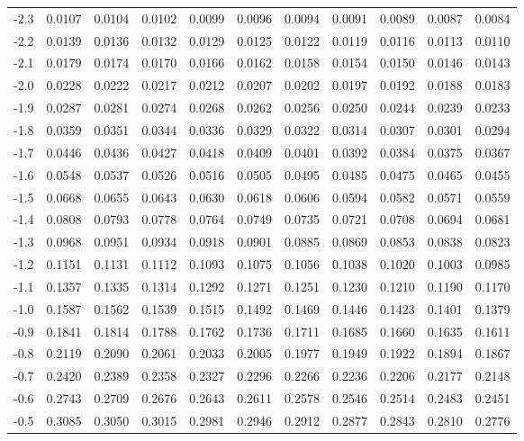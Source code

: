 \begin{table}[h]
{\begin{tabular}{|T{1.1}|T{1.4}|T{1.4}|T{1.4}|T{1.4}|T{1.4}|T{1.4}|T{1.4}|T{1.4}|T{1.4}|T{1.4}|}
-2.3 & 0.0107 & 0.0104 & 0.0102 & 0.0099 & 0.0096 & 0.0094 & 0.0091 & 0.0089 & 0.0087 & 0.0084 \\
-2.2 & 0.0139 & 0.0136 & 0.0132 & 0.0129 & 0.0125 & 0.0122 & 0.0119 & 0.0116 & 0.0113 & 0.0110 \\
-2.1 & 0.0179 & 0.0174 & 0.0170 & 0.0166 & 0.0162 & 0.0158 & 0.0154 & 0.0150 & 0.0146 & 0.0143 \\
-2.0 & 0.0228 & 0.0222 & 0.0217 & 0.0212 & 0.0207 & 0.0202 & 0.0197 & 0.0192 & 0.0188 & 0.0183 \\
-1.9 & 0.0287 & 0.0281 & 0.0274 & 0.0268 & 0.0262 & 0.0256 & 0.0250 & 0.0244 & 0.0239 & 0.0233 \\
-1.8 & 0.0359 & 0.0351 & 0.0344 & 0.0336 & 0.0329 & 0.0322 & 0.0314 & 0.0307 & 0.0301 & 0.0294 \\
-1.7 & 0.0446 & 0.0436 & 0.0427 & 0.0418 & 0.0409 & 0.0401 & 0.0392 & 0.0384 & 0.0375 & 0.0367 \\
-1.6 & 0.0548 & 0.0537 & 0.0526 & 0.0516 & 0.0505 & 0.0495 & 0.0485 & 0.0475 & 0.0465 & 0.0455 \\
-1.5 & 0.0668 & 0.0655 & 0.0643 & 0.0630 & 0.0618 & 0.0606 & 0.0594 & 0.0582 & 0.0571 & 0.0559 \\
-1.4 & 0.0808 & 0.0793 & 0.0778 & 0.0764 & 0.0749 & 0.0735 & 0.0721 & 0.0708 & 0.0694 & 0.0681 \\
-1.3 & 0.0968 & 0.0951 & 0.0934 & 0.0918 & 0.0901 & 0.0885 & 0.0869 & 0.0853 & 0.0838 & 0.0823 \\
-1.2 & 0.1151 & 0.1131 & 0.1112 & 0.1093 & 0.1075 & 0.1056 & 0.1038 & 0.1020 & 0.1003 & 0.0985 \\
-1.1 & 0.1357 & 0.1335 & 0.1314 & 0.1292 & 0.1271 & 0.1251 & 0.1230 & 0.1210 & 0.1190 & 0.1170 \\
-1.0 & 0.1587 & 0.1562 & 0.1539 & 0.1515 & 0.1492 & 0.1469 & 0.1446 & 0.1423 & 0.1401 & 0.1379 \\
-0.9 & 0.1841 & 0.1814 & 0.1788 & 0.1762 & 0.1736 & 0.1711 & 0.1685 & 0.1660 & 0.1635 & 0.1611 \\
-0.8 & 0.2119 & 0.2090 & 0.2061 & 0.2033 & 0.2005 & 0.1977 & 0.1949 & 0.1922 & 0.1894 & 0.1867 \\
-0.7 & 0.2420 & 0.2389 & 0.2358 & 0.2327 & 0.2296 & 0.2266 & 0.2236 & 0.2206 & 0.2177 & 0.2148 \\
-0.6 & 0.2743 & 0.2709 & 0.2676 & 0.2643 & 0.2611 & 0.2578 & 0.2546 & 0.2514 & 0.2483 & 0.2451 \\
-0.5 & 0.3085 & 0.3050 & 0.3015 & 0.2981 & 0.2946 & 0.2912 & 0.2877 & 0.2843 & 0.2810 & 0.2776 \\

\end{tabular}}
\end{table}
